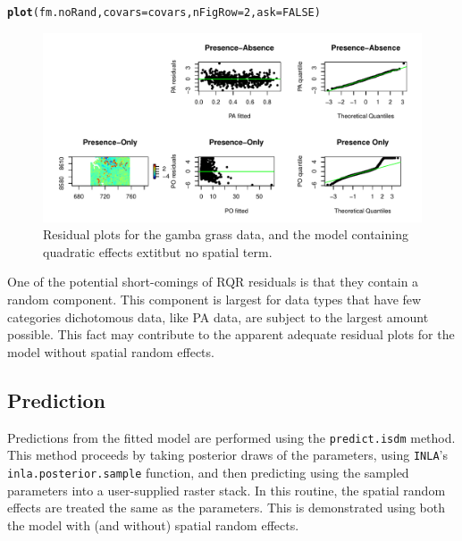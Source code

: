 \documentclass[article,shortnames,nojss]{jss}\usepackage[]{graphicx}\usepackage[]{xcolor}
\makeatletter
\def\maxwidth{ %
  \ifdim\Gin@nat@width>\linewidth
    \linewidth
  \else
    \Gin@nat@width
  \fi
}
\newcommand{\hlnum}[1]{\textcolor[rgb]{0.686,0.059,0.569}{#1}}%
\newcommand{\hlstd}[1]{\textcolor[rgb]{0.345,0.345,0.345}{#1}}%
\newcommand{\hlkwc}[1]{\textcolor[rgb]{0.333,0.667,0.333}{#1}}%
\newcommand{\hlkwd}[1]{\textcolor[rgb]{0.737,0.353,0.396}{\textbf{#1}}}%
\newenvironment{kframe}{%
 \def\at@end@of@kframe{}%
 \ifinner\ifhmode%
  \def\at@end@of@kframe{\end{minipage}}%
  \begin{minipage}{\columnwidth}%
 \fi\fi%
 \def\FrameCommand##1{\hskip\@totalleftmargin \hskip-\fboxsep
 \colorbox{shadecolor}{##1}\hskip-\fboxsep
     \hskip-\linewidth \hskip-\@totalleftmargin \hskip\columnwidth}%
 \MakeFramed {\advance\hsize-\width
   \@totalleftmargin\z@ \linewidth\hsize
   \@setminipage}}%
 {\par\unskip\endMakeFramed%
 \at@end@of@kframe}
\newenvironment{knitrout}{}{} %
\makeatother
\begin{document}
\begin{knitrout}
\color{fgcolor}\begin{kframe}
\begin{alltt}
\hlkwd{plot}\hlstd{( fm.noRand,} \hlkwc{covars}\hlstd{=covars,} \hlkwc{nFigRow}\hlstd{=}\hlnum{2}\hlstd{,} \hlkwc{ask}\hlstd{=}\hlnum{FALSE}\hlstd{)}
\end{alltt}
\end{kframe}\begin{figure}

{\centering \includegraphics[width=\maxwidth]{figure/residPlots2-1} 

}

\caption[Residual plots for the gamba grass data, and the model containing quadratic effects 	extit{but no spatial term}]{Residual plots for the gamba grass data, and the model containing quadratic effects 	extit{but no spatial term}.}\label{fig:residPlots2}
\end{figure}

\end{knitrout}
    
One of the potential short-comings of RQR residuals is that they contain a random component. This component is largest for data types that have few categories dichotomous data, like PA data, are subject to the largest amount possible. This fact may contribute to the apparent adequate residual plots for the model without spatial random effects.
  
\subsection*{Prediction} \label{subsec:pred}
  
Predictions from the fitted model are performed using the \texttt{predict.isdm} method. This method proceeds by taking posterior draws of the parameters, using \texttt{INLA}'s \texttt{inla.posterior.sample} function, and then predicting using the sampled parameters into a user-supplied raster stack. In this routine, the spatial random effects are treated the same as the parameters. This is demonstrated using both the model with (and without) spatial random effects.
\end{document}
